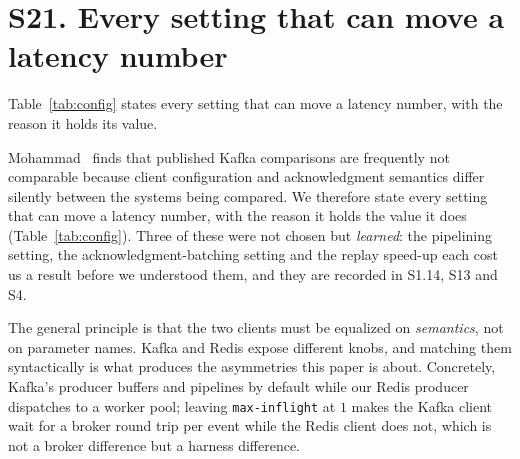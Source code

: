 \documentclass[10pt,journal,onecolumn]{IEEEtran}
\newcommand{\kafka}{Kafka}
\newcommand{\redis}{Redis}
\begin{document}
\section{S21. Every setting that can move a latency number}

Table~\ref{tab:config} states every setting that can move a latency number, with the reason it holds its value.


Mohammad~\cite{mohammad2025kafka} finds that published \kafka{} comparisons are frequently not
comparable because client configuration and acknowledgment semantics differ silently between the
systems being compared. We therefore state every setting that can move a latency number, with the
reason it holds the value it does (Table~\ref{tab:config}). Three of these were not chosen but
\emph{learned}: the pipelining setting, the acknowledgment-batching setting and the replay
speed-up each cost us a result before we understood them, and they are recorded in S1.14, S13
and S4.

The general principle is that the two clients must be equalized on \emph{semantics}, not on
parameter names. \kafka{} and \redis{} expose different knobs, and matching them syntactically is
what produces the asymmetries this paper is about. Concretely, \kafka{}'s producer buffers and
pipelines by default while our \redis{} producer dispatches to a worker pool; leaving
\texttt{max-inflight} at $1$ makes the \kafka{} client wait for a broker round trip per event
while the \redis{} client does not, which is not a broker difference but a harness difference.
\end{document}
